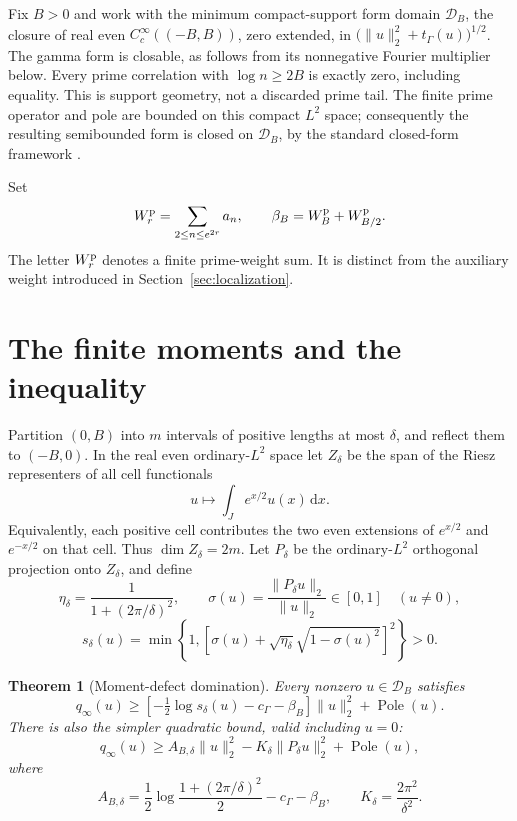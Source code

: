 \documentclass[11pt]{article}
\newtheorem{theorem}{Theorem}
\newcommand{\dd}{\,\mathrm d}
\newcommand{\norm}[1]{\lVert#1\rVert}
\newcommand{\Pole}{\operatorname{Pole}}
\begin{document}
Fix $B>0$ and work with the minimum compact-support form domain $\mathcal D_B$, the closure of real even $C_c^\infty((-B,B))$, zero extended, in $\bigl(\norm{u}_2^2+t_\Gamma(u)\bigr)^{1/2}$. The gamma form is closable, as follows from its nonnegative Fourier multiplier below. Every prime correlation with $\log n\ge2B$ is exactly zero, including equality. This is support geometry, not a discarded prime tail. The finite prime operator and pole are bounded on this compact $L^2$ space; consequently the resulting semibounded form is closed on $\mathcal D_B$, by the standard closed-form framework \cite[Chapter VI]{Kato}.

Set
\begin{equation}
 W_r^{\rm p}=\sum_{2\le n\le e^{2r}}a_n,\qquad
 \beta_B=W_B^{\rm p}+W_{B/2}^{\rm p}.
 \label{eq:beta}
\end{equation}
The letter $W_r^{\rm p}$ denotes a finite prime-weight sum. It is distinct from the auxiliary weight introduced in Section~\ref{sec:localization}.

\section{The finite moments and the inequality}
Partition $(0,B)$ into $m$ intervals of positive lengths at most $\delta$, and reflect them to $(-B,0)$. In the real even ordinary-$L^2$ space let $Z_\delta$ be the span of the Riesz representers of all cell functionals
\[
 u\longmapsto\int_J e^{x/2}u(x)\dd x.
\]
Equivalently, each positive cell contributes the two even extensions of $e^{x/2}$ and $e^{-x/2}$ on that cell. Thus $\dim Z_\delta=2m$. Let $P_\delta$ be the ordinary-$L^2$ orthogonal projection onto $Z_\delta$, and define
\begin{equation}
 \eta_\delta=\frac1{1+(2\pi/\delta)^2},\qquad
 \sigma(u)=\frac{\norm{P_\delta u}_2}{\norm u_2}\in[0,1]\quad(u\ne0),
 \label{eq:eta}
\end{equation}
\begin{equation}
 s_\delta(u)=\min\left\{1,
 \left[\sigma(u)+\sqrt{\eta_\delta}\sqrt{1-\sigma(u)^2}\right]^2\right\}>0.
 \label{eq:s}
\end{equation}

\begin{theorem}[Moment-defect domination]
Every nonzero $u\in\mathcal D_B$ satisfies
\begin{equation}
 \boxed{q_\infty(u)\ge
 \left[-\tfrac12\log s_\delta(u)-c_\Gamma-\beta_B\right]\norm u_2^2
 +\Pole(u).}
 \label{eq:nonlinear}
\end{equation}
There is also the simpler quadratic bound, valid including $u=0$:
\begin{equation}
 \boxed{q_\infty(u)\ge A_{B,\delta}\norm u_2^2
 -K_\delta\norm{P_\delta u}_2^2+\Pole(u),}
 \label{eq:linear}
\end{equation}
where
\begin{equation}
 A_{B,\delta}=\frac12\log\frac{1+(2\pi/\delta)^2}{2}-c_\Gamma-\beta_B,
 \qquad K_\delta=\frac{2\pi^2}{\delta^2}.
 \label{eq:constants}
\end{equation}
\end{theorem}
\end{document}
